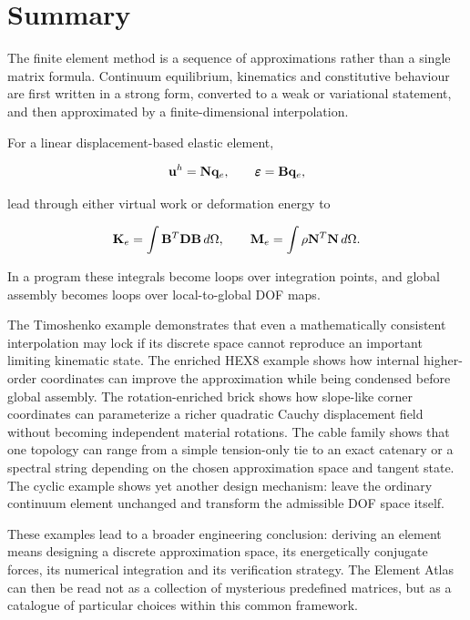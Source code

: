 \section{Summary}

The finite element method is a sequence of approximations rather than a single
matrix formula. Continuum equilibrium, kinematics and constitutive behaviour are
first written in a strong form, converted to a weak or variational statement,
and then approximated by a finite-dimensional interpolation.

For a linear displacement-based elastic element,

\begin{equation}
    \mathbf{u}^h=\mathbf{N}\mathbf{q}_e,
    \qquad
    \pmb{\varepsilon}=\mathbf{B}\mathbf{q}_e,
\end{equation}

lead through either virtual work or deformation energy to

\begin{equation}
    \mathbf{K}_e=\int\mathbf{B}^T\mathbf{D}\mathbf{B}\,d\Omega,
    \qquad
    \mathbf{M}_e=\int\rho\mathbf{N}^T\mathbf{N}\,d\Omega.
\end{equation}

In a program these integrals become loops over integration points, and global
assembly becomes loops over local-to-global DOF maps.

The Timoshenko example demonstrates that even a mathematically consistent
interpolation may lock if its discrete space cannot reproduce an important
limiting kinematic state. The enriched HEX8 example shows how internal
higher-order coordinates can improve the approximation while being condensed
before global assembly. The rotation-enriched brick shows how slope-like corner
coordinates can parameterize a richer quadratic Cauchy displacement field
without becoming independent material rotations. The cable family shows that
one topology can range from a simple tension-only tie to an exact catenary or a
spectral string depending on the chosen approximation space and tangent state.
The cyclic example shows yet another design mechanism: leave the ordinary
continuum element unchanged and transform the admissible DOF space itself.

These examples lead to a broader engineering conclusion: deriving an element
means designing a discrete approximation space, its energetically conjugate
forces, its numerical integration and its verification strategy. The Element
Atlas can then be read not as a collection of mysterious predefined matrices,
but as a catalogue of particular choices within this common framework.
